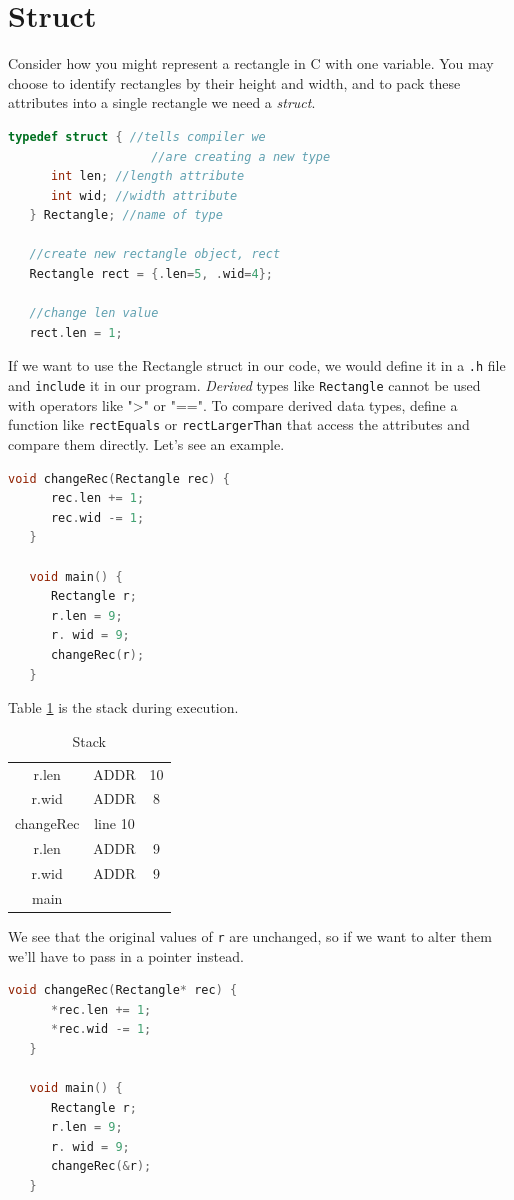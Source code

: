 \documentclass[nobib]{tufte-handout}
\begin{document}
\section{Struct}
Consider how you might represent a rectangle 
in C with one variable. You may choose to identify rectangles by their height and 
width, and to pack these attributes into a single rectangle we need a \emph{struct}. 
\begin{lstlisting}[language=C,caption=Struct]
   typedef struct { //tells compiler we 
                    //are creating a new type
      int len; //length attribute
      int wid; //width attribute
   } Rectangle; //name of type

   //create new rectangle object, rect
   Rectangle rect = {.len=5, .wid=4};

   //change len value
   rect.len = 1;
\end{lstlisting}
If we want to use the Rectangle struct in our code, we would define it 
in a \texttt{.h} file and \texttt{include} it in our program. \emph{Derived} 
types like \texttt{Rectangle} cannot be used with operators like ">" or 
"==". To compare derived data types, define a function like \texttt{rectEquals}
or \texttt{rectLargerThan} that access the attributes and compare them 
directly. Let's see an example.
\begin{lstlisting}[language=C,caption=changeRec]
   void changeRec(Rectangle rec) {
      rec.len += 1;
      rec.wid -= 1;
   }

   void main() {
      Rectangle r;
      r.len = 9;
      r. wid = 9;
      changeRec(r);
   }
\end{lstlisting}
Table \ref{table:structstack} is the stack during execution. 
\begin{table}[h]
   \centering
   \caption{Stack}
   \label{table:structstack}
   \begin{tabular}{|c c c|}
   \hline
   r.len & ADDR & 10 \\
   r.wid & ADDR & 8 \\
   changeRec & line 10 &\\
   \hline
   r.len & ADDR & 9 \\
   r.wid & ADDR & 9 \\
   main & & \\
   \hline
   \end{tabular}
\end{table}
We see that the original values of \texttt{r} are unchanged, 
so if we want to alter them we'll have to pass in a pointer instead. 
\begin{lstlisting}[language=C,caption=changeRec pointer]
   void changeRec(Rectangle* rec) {
      *rec.len += 1;
      *rec.wid -= 1;
   }

   void main() {
      Rectangle r;
      r.len = 9;
      r. wid = 9;
      changeRec(&r);
   }
\end{lstlisting}
\end{document}
